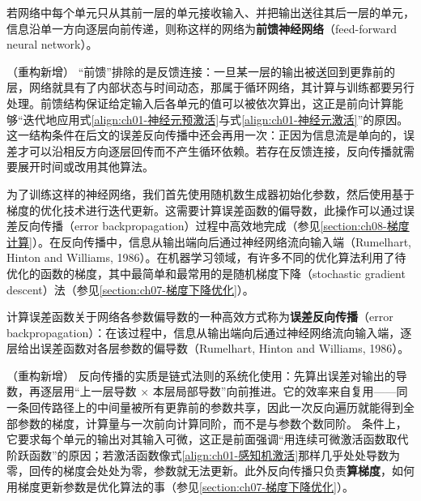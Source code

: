 \documentclass[../../main.tex]{subfiles}
\begin{document}
\begin{definition}[前馈神经网络]\label{definition:ch01-前馈神经网络}
若网络中每个单元只从其前一层的单元接收输入、并把输出送往其后一层的单元，信息沿单一方向逐层向前传递，则称这样的网络为\textbf{前馈神经网络}（feed-forward neural network）。
\end{definition}

\begin{remark}（重构新增）
“前馈”排除的是反馈连接：一旦某一层的输出被送回到更靠前的层，网络就具有了内部状态与时间动态，那属于循环网络，其计算与训练都要另行处理。前馈结构保证给定输入后各单元的值可以被依次算出，这正是前向计算能够“迭代地应用式\eqref{align:ch01-神经元预激活}与式\eqref{align:ch01-神经元激活}”的原因。
这一结构条件在后文的误差反向传播中还会再用一次：正因为信息流是单向的，误差才可以沿相反方向逐层回传而不产生循环依赖。若存在反馈连接，反向传播就需要展开时间或改用其他算法。
\end{remark}

为了训练这样的神经网络，我们首先使用随机数生成器初始化参数，然后使用基于梯度的优化技术进行迭代更新。这需要计算误差函数的偏导数，此操作可以通过误差反向传播（error backpropagation）过程中高效地完成（参见\cref{section:ch08-梯度计算}）。在反向传播中，信息从输出端向后通过神经网络流向输入端（Rumelhart, Hinton and Williams, 1986）。在机器学习领域，有许多不同的优化算法利用了待优化的函数的梯度，其中最简单和最常用的是随机梯度下降（stochastic gradient descent）法（参见\cref{section:ch07-梯度下降优化}）。

\begin{definition}[误差反向传播]\label{definition:ch01-误差反向传播}
计算误差函数关于网络各参数偏导数的一种高效方式称为\textbf{误差反向传播}（error backpropagation）：在该过程中，信息从输出端向后通过神经网络流向输入端，逐层给出误差函数对各层参数的偏导数（Rumelhart, Hinton and Williams, 1986）。
\end{definition}

\begin{remark}（重构新增）
反向传播的实质是链式法则的系统化使用：先算出误差对输出的导数，再逐层用“上一层导数 × 本层局部导数”向前推进。它的效率来自复用——同一条回传路径上的中间量被所有更靠前的参数共享，因此一次反向遍历就能得到全部参数的梯度，计算量与一次前向计算同阶，而不是与参数个数同阶。
条件上，它要求每个单元的输出对其输入可微，这正是前面强调“用连续可微激活函数取代阶跃函数”的原因；若激活函数像式\eqref{align:ch01-感知机激活}那样几乎处处导数为零，回传的梯度会处处为零，参数就无法更新。此外反向传播只负责\textbf{算梯度}，如何用梯度更新参数是优化算法的事（参见\cref{section:ch07-梯度下降优化}）。
\end{remark}
\end{document}
